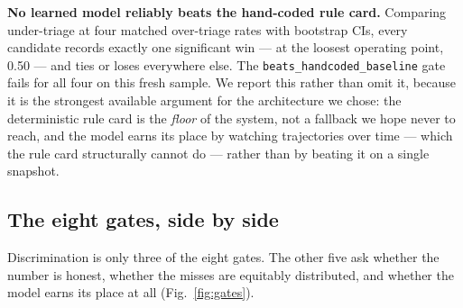 \documentclass[10pt,a4paper,twocolumn]{article}
\newcommand{\cm}[1]{\texttt{#1}}
\begin{document}
\begin{tcolorbox}[mpwarn]
\textbf{No learned model reliably beats the hand-coded rule card.} Comparing under-triage at four
matched over-triage rates with bootstrap CIs, every candidate records exactly one significant win
--- at the loosest operating point, 0.50 --- and ties or loses everywhere else. The
\cm{beats\_handcoded\_baseline} gate fails for all four on this fresh sample. We report this rather
than omit it, because it is the strongest available argument for the architecture we chose: the
deterministic rule card is the \emph{floor} of the system, not a fallback we hope never to reach,
and the model earns its place by watching trajectories over time --- which the rule card structurally
cannot do --- rather than by beating it on a single snapshot.
\end{tcolorbox}

\subsection{The eight gates, side by side}
Discrimination is only three of the eight gates. The other five ask whether the number is honest, whether the misses are equitably distributed, and whether the model earns its place at all (Fig.~\ref{fig:gates}).
\end{document}
